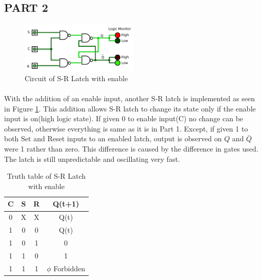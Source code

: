 \documentclass[pdftex,12pt,a4paper]{article}
\begin{document}
\begin{flushleft}
\subsection{PART 2}


\begin{figure}[h]
	\centering
	\includegraphics[width=0.5\textwidth]{part2.png}	
	\caption{Circuit of S-R Latch with enable}
	\label{fig:part2}
\end{figure}

\paragraph{}
With the addition of an enable input, another S-R latch is implemented as seen in Figure \ref{fig:part2}. This addition allows S-R latch to change its state only if the enable input is on(high logic state). If given 0 to enable input(C) no change can be observed, otherwise everything is same as it is in Part 1. Except, if given 1 to both Set and Reset inputs to an enabled latch, output is observed on $Q$ and $\bar{Q}$ were 1 rather than zero. This difference is caused by the difference in gates used. The latch is still unpredictable and oscillating very fast. 

\begin{table}[h]
\begin{tabular}{ccc|c}
C & S & R & Q(t+1)           \\ \hline
0 & X & X & Q(t)             \\
1 & 0 & 0 & Q(t)             \\
1 & 0 & 1 & 0                \\
1 & 1 & 0 & 1                \\
1 & 1 & 1 & $\phi$ Forbidden
\end{tabular}
\centering
\caption{Truth table of S-R Latch with enable}
\label{table:part2}
\end{table}



\end{flushleft}
\end{document}
